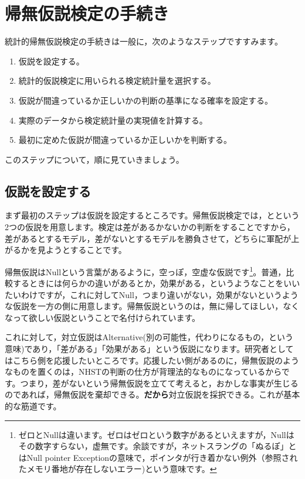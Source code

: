 \documentclass{ltjsbook}
\begin{document}
\section{帰無仮説検定の手続き}
統計的帰無仮説検定の手続きは一般に，次のようなステップですすみます。
\begin{enumerate}
    \item 仮説を設定する。
    \item 統計的仮説検定に用いられる検定統計量を選択する。
    \item 仮説が間違っているか正しいかの判断の基準になる確率を設定する。
    \item 実際のデータから検定統計量の実現値を計算する。
    \item 最初に定めた仮説が間違っているか正しいかを判断する。
\end{enumerate}

このステップについて，順に見ていきましょう。
\subsection{仮説を設定する}
まず最初のステップは仮説を設定するところです。帰無仮説検定では，とという2つの仮説を用意します。検定は差があるかないかの判断をすることですから，差があるとするモデル，差がないとするモデルを勝負させて，どちらに軍配が上がるかを見ようとすることです。

帰無仮説はNullという言葉があるように，空っぽ，空虚な仮説です\footnote{ゼロとNullは違います。ゼロはゼロという数字があるといえますが，Nullはその数字すらない，虚無です。余談ですが，ネットスラングの「ぬるぽ」とはNull pointer Exceptionの意味で，ポインタが行き着かない例外（参照されたメモリ番地が存在しないエラー)という意味です。}。普通，比較するときには何らかの違いがあるとか，効果がある，というようなことをいいたいわけですが，これに対してNull，つまり違いがない，効果がないというような仮説を一方の側に用意します。帰無仮説というのは，無に帰してほしい，なくなって欲しい仮説ということで名付けられています。

これに対して，対立仮説はAlternative(別の可能性，代わりになるもの，という意味)であり，「差がある」「効果がある」という仮説になります。研究者としてはこちら側を応援したいところです。応援したい側があるのに，帰無仮説のようなものを置くのは，NHSTの判断の仕方が背理法的なものになっているからです。つまり，差がないという帰無仮説を立てて考えると，おかしな事実が生じるのであれば，帰無仮説を棄却できる。\textbf{だから}対立仮説を採択できる。これが基本的な筋道です。
\end{document}
